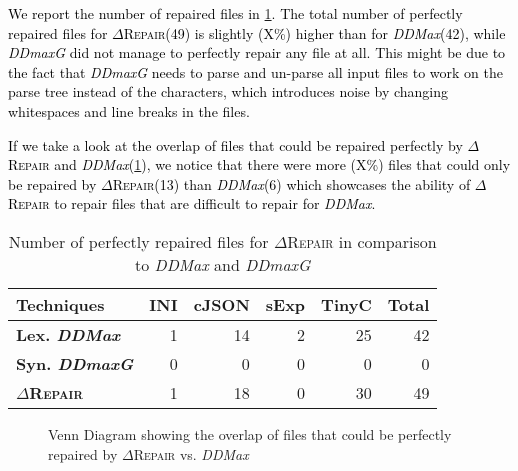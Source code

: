 \documentclass[acmsmall,screen,review,anonymous]{acmart}
\newcommand{\revise}[1]{\textcolor{black}{#1}}
\newcommand{\approach}{\textsc{$\Delta$Repair}\xspace}
\newcommand{\ddmax}{\textit{DDMax}\xspace}
\newcommand{\ddmaxg}{\textit{DDmaxG}\xspace}
\begin{document}
\revise{We report the number of repaired files in \cref{tab:perfectrepairs}.
The total number of perfectly repaired files for \approach (49) is slightly (X\%) higher than for \ddmax (42), while \ddmaxg did not manage to perfectly repair any file at all.
This might be due to the fact that \ddmaxg needs to parse and un-parse all input files to work on the parse tree instead of the characters, which introduces noise by changing whitespaces and line breaks in the files.
}

\revise{If we take a look at the overlap of files that could be repaired perfectly by \approach and \ddmax (\cref{fig:perfectlyrepairedvenndiagram}), we notice that there were more (X\%) files that could only be repaired by \approach (13) than \ddmax (6) which showcases the ability of \approach to repair files that are difficult to repair for \ddmax.
}

\begin{table}[!tbp]\centering
\caption{Number of perfectly repaired files for \approach in comparison to \ddmax and \ddmaxg
}
\begin{tabular}{|l |  r  r  r  r | r |}
\hline
\textbf{Techniques}&  \textbf{INI}&\textbf{cJSON} &\textbf{sExp}&\textbf{TinyC}&\textbf{Total}  \\
\hline
\textbf{Lex. \ddmax}  & 1 & 14 & 2 & 25 & 42 \\
\textbf{Syn. \ddmaxg} & 0 & 0  & 0 & 0  & 0  \\
\hline
\textbf{\approach} &  1 & 18  & 0 & 30 & 49  \\
\hline
\end{tabular}
\label{tab:perfectrepairs}
\end{table}

\begin{figure}[!tbp]\centering
\caption{Venn Diagram showing the overlap of files that could be perfectly repaired by \approach vs. \ddmax
}
\centering
\begin{minipage}[b]{0.45\textwidth}
    \centering
\end{minipage}
\vspace{-0.4cm}
\label{fig:perfectlyrepairedvenndiagram}
\end{figure}
\end{document}
